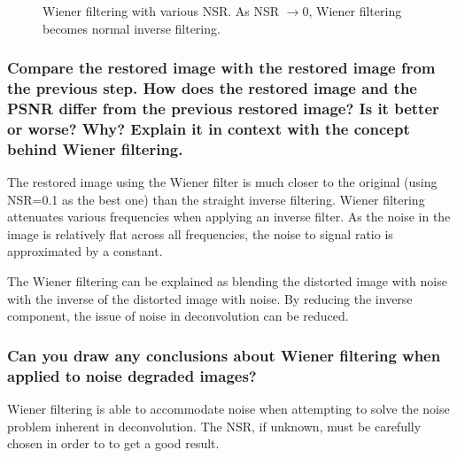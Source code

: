 \begin{figure}[ht]
\centering
	
	\caption{Wiener filtering with various NSR. As NSR $\rightarrow$0, Wiener filtering becomes normal inverse filtering.}
\end{figure}


\subsubsection{Compare the restored image with the restored image from the previous step. How does the restored image and the PSNR differ from the previous restored image? Is it better or worse? Why? Explain it in context with the concept behind Wiener filtering.}

The restored image using the Wiener filter is much closer to the original (using NSR=0.1 as the best one) than the straight inverse filtering. Wiener filtering attenuates various frequencies when applying an inverse filter. As the noise in the image is relatively flat across all frequencies, the noise to signal ratio is approximated by a constant.

The Wiener filtering can be explained as blending the distorted image with noise with the inverse of the distorted image with noise. By reducing the inverse component, the issue of noise in deconvolution can be reduced.

\subsubsection{Can you draw any conclusions about Wiener filtering when applied to noise degraded images?}

Wiener filtering is able to accommodate noise when attempting to solve the noise problem inherent in deconvolution. The NSR, if unknown, must be carefully chosen in order to to get a good result.
